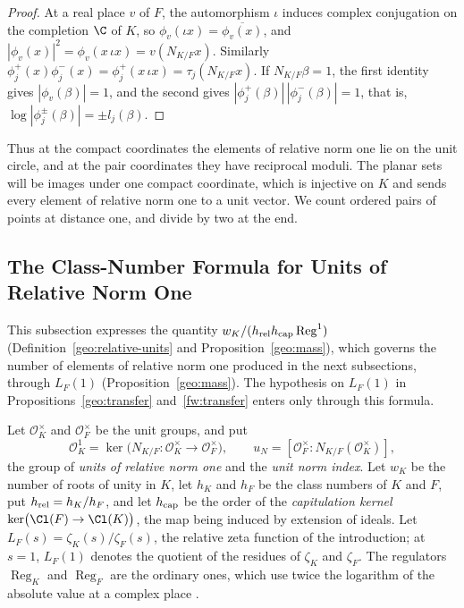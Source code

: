 \begin{proof}
At a real place $v$ of $F$, the automorphism $\iota$ induces complex
conjugation on the completion $\C$ of $K$, so
$\phi_v(\iota x)=\overline{\phi_v(x)}$, and
$|\phi_v(x)|^2=\phi_v(x\,\iota x)=v(N_{K/F}x)$. Similarly
$\phi_j^+(x)\phi_j^-(x)=\phi_j^+(x\,\iota x)=\tau_j(N_{K/F}x)$. If
$N_{K/F}\beta=1$, the first identity gives $|\phi_v(\beta)|=1$, and the second
gives $|\phi_j^+(\beta)|\,|\phi_j^-(\beta)|=1$, that is,
$\log|\phi_j^\pm(\beta)|=\pm l_j(\beta)$.
\end{proof}

Thus at the compact coordinates the elements of relative norm one lie on the
unit circle, and at the pair coordinates they have reciprocal moduli. The
planar sets will be images under one compact coordinate, which is injective on
$K$ and sends every element of relative norm one to a unit vector. We count
ordered pairs of points at distance one, and divide by two at the end.

\subsection{The Class-Number Formula for Units of Relative Norm One}

This subsection expresses the quantity
$w_K/(h_{\rm rel}h_{\rm cap}\operatorname{Reg}^1)$
(Definition~\ref{geo:relative-units} and Proposition~\ref{geo:mass}), which governs the number
of elements of relative norm one produced in the next subsections, through
$L_F(1)$ (Proposition~\ref{geo:mass}). The hypothesis on $L_F(1)$ in
Propositions~\ref{geo:transfer} and~\ref{fw:transfer} enters only through this
formula.

\begin{definition}\label{geo:relative-units}
Let $\mathcal O_K^\times$ and $\mathcal O_F^\times$ be the unit groups,
and put
\[
 \mathcal O_K^1=\ker\bigl(N_{K/F}\colon\mathcal O_K^\times\to
 \mathcal O_F^\times\bigr),
 \qquad u_N=[\mathcal O_F^\times:N_{K/F}(\mathcal O_K^\times)],
\]
the group of \emph{units of relative norm one} and the \emph{unit norm index}.
Let $w_K$ be the number of roots of unity in $K$, let $h_K$ and $h_F$ be
the class numbers of $K$ and $F$, put $h_{\rm rel}=h_K/h_F$, and let
$h_{\rm cap}$ be the order of the \emph{capitulation kernel}
$\ker\bigl(\Cl(F)\to\Cl(K)\bigr)$, the map being induced by extension of
ideals. Let $L_F(s)=\zeta_K(s)/\zeta_F(s)$, the relative zeta function of the
introduction; at $s=1$, $L_F(1)$ denotes the quotient
of the residues of $\zeta_K$ and $\zeta_F$. The regulators
$\operatorname{Reg}_K$ and $\operatorname{Reg}_F$ are the ordinary ones,
which use twice the logarithm of the absolute value at a complex place
\cite[Chapter~5]{MilneANT}.
\end{definition}


